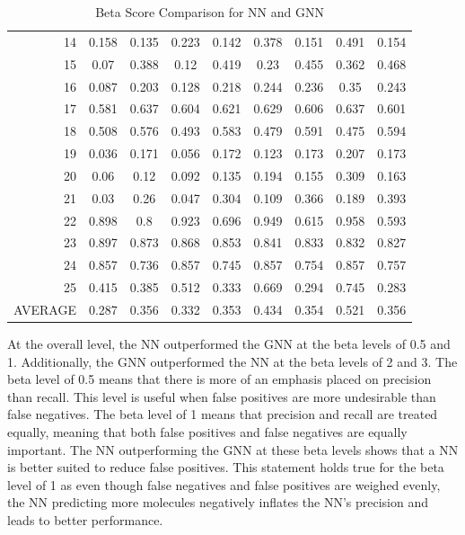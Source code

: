 \documentclass[10pt,twocolumn]{article}
\begin{document}
\begin{table}[ht]
{\begin{tabular}{r|cc|cc|cc|cc}
        14  & 0.158 & 0.135 & 0.223 & 0.142 & 0.378 & 0.151 & 0.491 & 0.154 \\
        15  & 0.07 & 0.388 & 0.12 & 0.419 & 0.23 & 0.455 & 0.362 & 0.468 \\
        16  & 0.087 & 0.203 & 0.128 & 0.218 & 0.244 & 0.236 & 0.35 & 0.243 \\
        17  & 0.581 & 0.637 & 0.604 & 0.621 & 0.629 & 0.606 & 0.637 & 0.601 \\
        18  & 0.508 & 0.576 & 0.493 & 0.583 & 0.479 & 0.591 & 0.475 & 0.594 \\
        19  & 0.036 & 0.171 & 0.056 & 0.172 & 0.123 & 0.173 & 0.207 & 0.173 \\
        20  & 0.06 & 0.12 & 0.092 & 0.135 & 0.194 & 0.155 & 0.309 & 0.163 \\
        21  & 0.03 & 0.26 & 0.047 & 0.304 & 0.109 & 0.366 & 0.189 & 0.393 \\
        22  & 0.898 & 0.8 & 0.923 & 0.696 & 0.949 & 0.615 & 0.958 & 0.593 \\
        23  & 0.897 & 0.873 & 0.868 & 0.853 & 0.841 & 0.833 & 0.832 & 0.827 \\
        24  & 0.857 & 0.736 & 0.857 & 0.745 & 0.857 & 0.754 & 0.857 & 0.757 \\
        25  & 0.415 & 0.385 & 0.512 & 0.333 & 0.669 & 0.294 & 0.745 & 0.283 \\
        AVERAGE  & 0.287 & 0.356 & 0.332 & 0.353 & 0.434 & 0.354 & 0.521 & 0.356 \\
    \end{tabular}
    }
    \caption{Beta Score Comparison for NN and GNN}
    \label{tbl:data}
\end{table}




At the overall level, the NN outperformed the GNN at the beta levels of 0.5 and 1. Additionally, the GNN outperformed the NN at the beta levels of 2 and 3. The beta level of 0.5 means that there is more of an emphasis placed on precision than recall. This level is useful when false positives are more undesirable than false negatives. The beta level of 1 means that precision and recall are treated equally, meaning that both false positives and false negatives are equally important. The NN outperforming the GNN at these beta levels shows that a NN is better suited to reduce false positives. This statement holds true for the beta level of 1 as even though false negatives and false positives are weighed evenly, the NN predicting more molecules negatively inflates the NN’s precision and leads to better performance. 
\end{document}
